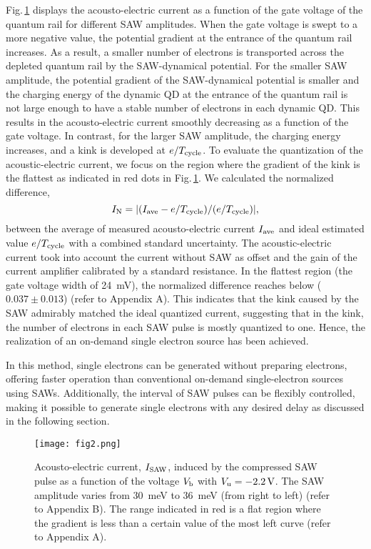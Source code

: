 \documentclass{article}
\begin{document}
Fig.\,\ref{fig:Figure2} displays the acousto-electric current as a function of the gate voltage of the quantum rail for different SAW amplitudes. 
When the gate voltage is swept to a more negative value, the potential gradient at the entrance of the quantum rail increases. 
As a result, a smaller number of electrons is transported across the depleted quantum rail by the SAW-dynamical potential.
For the smaller SAW amplitude, the potential gradient of the SAW-dynamical potential is smaller and the charging energy of the dynamic QD at the entrance of the quantum rail is not large enough to have a stable number of electrons in each dynamic QD.
This results in the acousto-electric current smoothly decreasing as a function of the gate voltage.
In contrast, for the larger SAW amplitude, the charging energy increases, and a kink is developed at $e/T_{\rm cycle}$.
To evaluate the quantization of the acoustic-electric current, we focus on the region where the gradient of the kink is the flattest as indicated in red dots in Fig.\,\ref{fig:Figure2}. We calculated the normalized difference, $$I_{\rm N}=|(I_{\rm ave}-e/T_{\rm cycle})/(e/T_{\rm cycle})|,$$ between the average of measured acousto-electric current $I_{\rm ave}$ and ideal estimated value $e/T_{\rm cycle}$ with a combined standard uncertainty. The acoustic-electric current took into account the current without SAW as offset and the gain of the current amplifier calibrated by a standard resistance. In the flattest region (the gate voltage width of \SI{24}{mV}), the normalized difference reaches below ($0.037 \pm 0.013$) (refer to Appendix A). This indicates that the kink caused by the SAW admirably matched the ideal quantized current, suggesting that in the kink, the number of electrons in each SAW pulse is mostly quantized to one. Hence, the realization of an on-demand single electron source has been achieved.

In this method, single electrons can be generated without preparing electrons, offering faster operation than conventional on-demand single-electron sources using SAWs. Additionally, the interval of SAW pulses can be flexibly controlled, making it possible to generate single electrons with any desired delay as discussed in the following section.

\begin{figure}
\centering
\texttt{[image: fig2.png]}
\caption{\label{fig:Figure2}Acousto-electric current, $I_{\rm SAW}$, induced by the compressed SAW pulse as a function of the voltage $V_{\rm b}$ with $V_{\rm u}=\SI{-2.2}{V}$. The SAW amplitude varies from \SI{30}{meV} to \SI{36}{meV} (from right to left) (refer to Appendix B). The range indicated in red is a flat region where the gradient is less than a certain value of the most left curve (refer to Appendix A).}
\end{figure}
\end{document}
